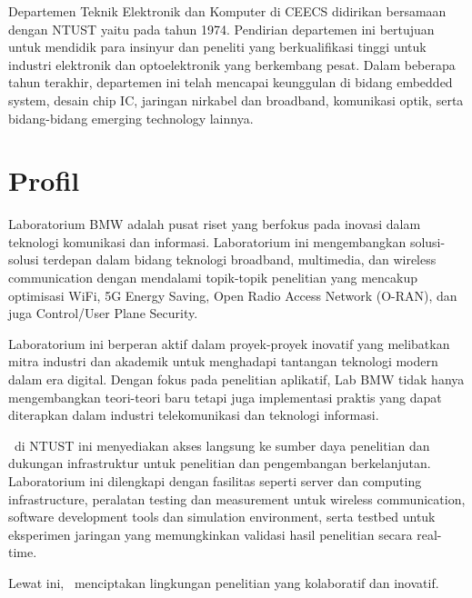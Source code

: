 Departemen Teknik Elektronik dan Komputer di CEECS didirikan bersamaan dengan NTUST yaitu pada tahun 1974. Pendirian departemen ini bertujuan untuk mendidik para insinyur dan peneliti yang berkualifikasi tinggi untuk industri elektronik dan optoelektronik yang berkembang pesat. Dalam beberapa tahun terakhir, departemen ini telah mencapai keunggulan di bidang embedded system, desain chip IC, jaringan nirkabel dan broadband, komunikasi optik, serta bidang-bidang emerging technology lainnya.

\section{Profil \namaLab}

Laboratorium BMW adalah pusat riset yang berfokus pada inovasi dalam teknologi komunikasi dan informasi. Laboratorium ini mengembangkan solusi-solusi terdepan dalam bidang teknologi broadband, multimedia, dan wireless communication dengan mendalami topik-topik penelitian yang mencakup optimisasi WiFi, 5G Energy Saving, Open Radio Access Network (O-RAN), dan juga Control/User Plane Security.

Laboratorium ini berperan aktif dalam proyek-proyek inovatif yang melibatkan mitra industri dan akademik untuk menghadapi tantangan teknologi modern dalam era digital. Dengan fokus pada penelitian aplikatif, Lab BMW tidak hanya mengembangkan teori-teori baru tetapi juga implementasi praktis yang dapat diterapkan dalam industri telekomunikasi dan teknologi informasi.

\namaLab \ di NTUST ini menyediakan akses langsung ke sumber daya penelitian dan dukungan infrastruktur untuk penelitian dan pengembangan berkelanjutan. Laboratorium ini dilengkapi dengan fasilitas seperti server dan computing infrastructure, peralatan testing dan measurement untuk wireless communication, software development tools dan simulation environment, serta testbed untuk eksperimen jaringan yang memungkinkan validasi hasil penelitian secara real-time.

Lewat ini, \namaLab \ menciptakan lingkungan penelitian yang kolaboratif dan inovatif.